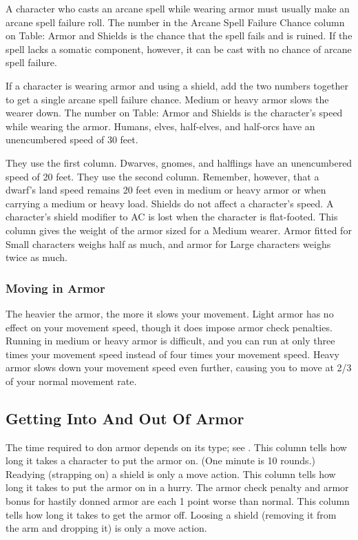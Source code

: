  A character who casts an arcane spell while wearing armor must usually make an arcane spell failure roll. The number in the Arcane Spell Failure Chance column on Table: Armor and Shields is the chance that the spell fails and is ruined. If the spell lacks a somatic component, however, it can be cast with no chance of arcane spell failure.

 If a character is wearing armor and using a shield, add the two numbers together to get a single arcane spell failure chance.
 Medium or heavy armor slows the wearer down. The number on Table: Armor and Shields is the character's speed while wearing the armor. Humans, elves, half-elves, and half-orcs have an unencumbered speed of 30 feet.
\par They use the first column. Dwarves, gnomes, and halflings have an unencumbered speed of 20 feet. They use the second column. Remember, however, that a dwarf's land speed remains 20 feet even in medium or heavy armor or when carrying a medium or heavy load.
 Shields do not affect a character's speed.
 A character's shield modifier to AC is lost when the character is flat-footed.
 This column gives the weight of the armor sized for a Medium wearer. Armor fitted for Small characters weighs half as much, and armor for Large characters weighs twice as much.

\subsubsection{Moving in Armor}
The heavier the armor, the more it slows your movement. Light armor has no effect on your movement speed, though it does impose armor check penalties. Running in medium or heavy armor is difficult, and you can run at only three times your movement speed instead of four times your movement speed. Heavy armor slows down your movement speed even further, causing you to move at 2/3 of your normal movement rate.

\subsection{Getting Into And Out Of Armor}
The time required to don armor depends on its type; see .
 This column tells how long it takes a character to put the armor on. (One minute is 10 rounds.) Readying (strapping on) a shield is only a move action.
 This column tells how long it takes to put the armor on in a hurry. The armor check penalty and armor bonus for hastily donned armor are each 1 point worse than normal.
 This column tells how long it takes to get the armor off. Loosing a shield (removing it from the arm and dropping it) is only a move action.

